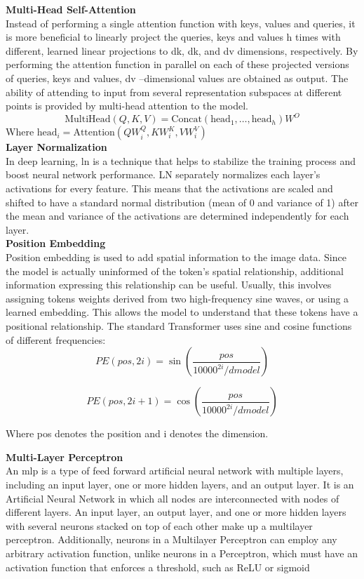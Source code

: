 \documentclass{ioereport}
\begin{document}
\textbf{Multi-Head Self-Attention}\\
Instead of performing a single attention function with keys, values and queries, it is
more beneficial to linearly project the queries, keys and values h times with different,
learned linear projections to dk, dk, and dv dimensions, respectively. By performing the
attention function in parallel on each of these projected versions of queries, keys and
values, dv –dimensional values are obtained as output. The ability of attending to input
from several representation subspaces at different points is provided by multi-head
attention to the model.
\begin{equation}
\text{MultiHead}(Q, K, V) = \text{Concat}(\text{head}_1, \dots, \text{head}_h) W^O
\end{equation}
Where \(\text{head}_i = \text{Attention}(QW_i^Q, KW_i^K, VW_i^V)\)
\vspace{1em}\\
\textbf{Layer Normalization}\\
In deep learning, \gls{ln} is a technique that helps to stabilize the
training process and boost neural network performance. LN separately normalizes each
layer's activations for every feature. This means that the activations are scaled and
shifted to have a standard normal distribution (mean of 0 and variance of 1) after the
mean and variance of the activations are determined independently for each layer.\\
\textbf{Position Embedding}\\
Position embedding is used to add spatial information to the image data. Since the
model is actually uninformed of the token's spatial relationship, additional information
expressing this relationship can be useful. Usually, this involves assigning tokens
weights derived from two high-frequency sine waves, or using a learned embedding.
This allows the model to understand that these tokens have a positional relationship.
The standard Transformer uses sine and cosine functions of different frequencies: 
\begin{equation}
PE(pos, 2i) = \sin(\frac{pos}{ 10000^{2i}/dmodel})
\end{equation}

\begin{equation}
PE(pos, 2i + 1) = \cos(\frac{pos}{10000^{2i}/dmodel})
\end{equation}


 Where pos denotes the position and i denotes the dimension.

\textbf{Multi-Layer Perceptron}\\
An \gls{mlp} is a type of feed forward artificial neural network with multiple layers,
including an input layer, one or more hidden layers, and an output layer. It is an
Artificial Neural Network in which all nodes are interconnected with nodes of different
layers. An input layer, an output layer, and one or more hidden layers with several
neurons stacked on top of each other make up a multilayer perceptron. Additionally,
neurons in a Multilayer Perceptron can employ any arbitrary activation function, unlike neurons in a Perceptron, which must have an activation function that enforces a
threshold, such as ReLU or sigmoid
\end{document}
